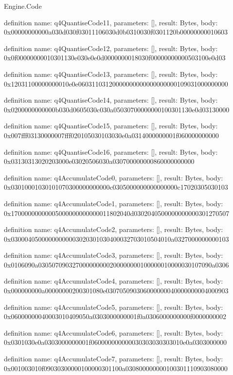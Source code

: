\begin{lexlean}{Engine.Code}
\begin{semanticmodule}
definition{
  name: q4QuantiseCode11,
  parameters: [],
  result: Bytes,
  body: 0x00000000000a030d030f03011106030d0b0310030f0301120b00000000010603
}

definition{
  name: q4QuantiseCode12,
  parameters: [],
  result: Bytes,
  body: 0x0f00000000010301130e030e0e0d0000000018030f00000000000503100e0d03
}

definition{
  name: q4QuantiseCode13,
  parameters: [],
  result: Bytes,
  body: 0x12031100000000010e0e06031103120000000000000000000109031000000000
}

definition{
  name: q4QuantiseCode14,
  parameters: [],
  result: Bytes,
  body: 0x0200000000000b030d0605030c030a05030700000000100301130e0d03130000
}

definition{
  name: q4QuantiseCode15,
  parameters: [],
  result: Bytes,
  body: 0x007fff03130000007fff020105030103030e0a0314000000001f060000000000
}

definition{
  name: q4QuantiseCode16,
  parameters: [],
  result: Bytes,
  body: 0x03130313020203000e03020506030a030700000000860000000000
}

definition{
  name: q4AccumulateCode0,
  parameters: [],
  result: Bytes,
  body: 0x03010001030101070300000000000c0305000000000000000c17020305030103
}

definition{
  name: q4AccumulateCode1,
  parameters: [],
  result: Bytes,
  body: 0x17000000000005000000000000011802040d0302040500000000000301270507
}

definition{
  name: q4AccumulateCode2,
  parameters: [],
  result: Bytes,
  body: 0x03000405000000000003020301030400032703010504010a0327000000000103
}

definition{
  name: q4AccumulateCode3,
  parameters: [],
  result: Bytes,
  body: 0x0106090a030507090327000000000200000000100000010000030107090a0306
}

definition{
  name: q4AccumulateCode4,
  parameters: [],
  result: Bytes,
  body: 0x000000000a00000000200301080e030705090306000000040000000004000903
}

definition{
  name: q4AccumulateCode5,
  parameters: [],
  result: Bytes,
  body: 0x06000000040003010409050a0303000000001f0a0306000000000f0000000002
}

definition{
  name: q4AccumulateCode6,
  parameters: [],
  result: Bytes,
  body: 0x0301030e0a0303000000001f060000000000030303030303010e0a0303000000
}

definition{
  name: q4AccumulateCode7,
  parameters: [],
  result: Bytes,
  body: 0x001003010f09030300000100000301100a030800000000100301110903080000
}


\end{semanticmodule}
\end{lexlean}
